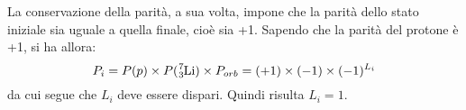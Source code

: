 \begin{Answer}
\begin{enumerate}
          La conservazione della parit\`a, a sua volta, impone che la parit\`a dello stato iniziale sia 
          uguale a quella finale, cio\`e sia +1. Sapendo che la parit\`a del protone \`e +1, si ha allora: 
          \[
          P_i = P(p) \times P(\ce{^7_3Li}) \times  P_{orb} = (+1) \times (-1) \times (-1)^{L_i}
          \]
          da cui segue che $L_i$ deve essere dispari. Quindi risulta $L_i = 1$.
  \end{enumerate}
\end{Answer}
